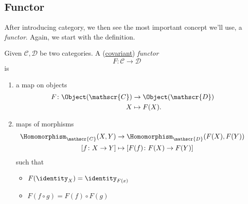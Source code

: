\subsection{Functor}
After introducing category, we then see the most important concept we'll use, a \emph{functor}. Again, we start with the definition.
\begin{definition}[Functor]
	Given \(\mathscr{C} , \mathscr{D} \) be two categories. A (\underline{covariant}) \emph{functor}
	\[
		F\colon \mathscr{C} \to \mathscr{D}
	\]
	is
	\begin{enumerate}
		\item a map on objects
		      \[
			      \begin{split}
				      F\colon \Object(\mathscr{C} )&\to \Object(\mathscr{D} )\\
				      X&\mapsto F(X).
			      \end{split}
		      \]
		\item maps of morphisms
		      \[
			      \begin{split}
				      \Homomorphism_{\mathscr{C} }(X, Y)&\to \Homomorphism_{\mathscr{D} }(F(X), F(Y))\\
				      \left[f\colon X\to Y\right] &\mapsto \left[F(f)\colon F(X)\to F(Y)\right]
			      \end{split}
		      \]
		      such that
		      \begin{itemize}
			      \item \(F(\identity_{X} ) = \identity_{F(x)} \)
			      \item \(F(f\circ g) = F(f)\circ F(g)\)
		      \end{itemize}
	\end{enumerate}
\end{definition}